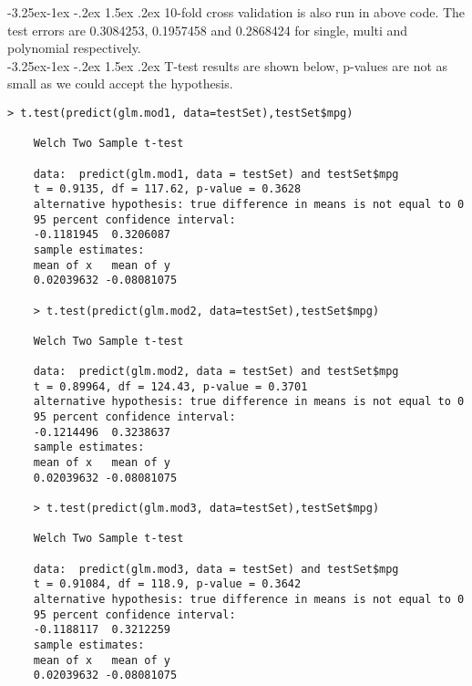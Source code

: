 \documentclass[12pt]{article}
\makeatletter
\renewcommand\subsection{\@startsection{subsection}{2}{\z@}%
	{-3.25ex\@plus -1ex \@minus -.2ex}%
	{1.5ex \@plus .2ex}%
	{\normalfont\large\bfseries}}%
\makeatother
\begin{document}
	\subsection{}
	10-fold cross validation is also run in above code. The test errors are 0.3084253, 0.1957458 and 0.2868424 for single, multi and polynomial respectively.\\
	\subsection{}
	T-test results are shown below, p-values are not as small as we could accept the hypothesis.\\
	\lstset{language=R}
	\lstset{frame=lines}
	\lstset{basicstyle=\footnotesize\ttfamily}
	\begin{lstlisting}[breaklines=true]
	> t.test(predict(glm.mod1, data=testSet),testSet$mpg)
	
	Welch Two Sample t-test
	
	data:  predict(glm.mod1, data = testSet) and testSet$mpg
	t = 0.9135, df = 117.62, p-value = 0.3628
	alternative hypothesis: true difference in means is not equal to 0
	95 percent confidence interval:
	-0.1181945  0.3206087
	sample estimates:
	mean of x   mean of y 
	0.02039632 -0.08081075 
	
	> t.test(predict(glm.mod2, data=testSet),testSet$mpg)
	
	Welch Two Sample t-test
	
	data:  predict(glm.mod2, data = testSet) and testSet$mpg
	t = 0.89964, df = 124.43, p-value = 0.3701
	alternative hypothesis: true difference in means is not equal to 0
	95 percent confidence interval:
	-0.1214496  0.3238637
	sample estimates:
	mean of x   mean of y 
	0.02039632 -0.08081075 
	
	> t.test(predict(glm.mod3, data=testSet),testSet$mpg)
	
	Welch Two Sample t-test
	
	data:  predict(glm.mod3, data = testSet) and testSet$mpg
	t = 0.91084, df = 118.9, p-value = 0.3642
	alternative hypothesis: true difference in means is not equal to 0
	95 percent confidence interval:
	-0.1188117  0.3212259
	sample estimates:
	mean of x   mean of y 
	0.02039632 -0.08081075  
	\end{lstlisting}
\end{document}
